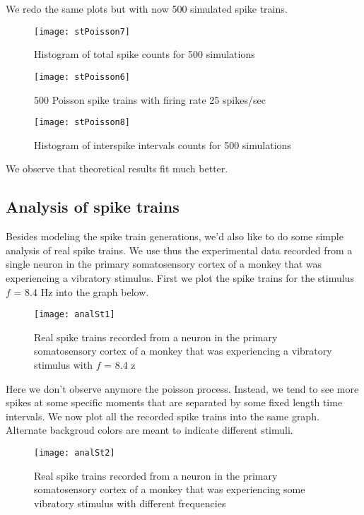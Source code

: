 \noindent
We redo the same plots but with now 500 simulated spike trains.

\vspace*{-1em}
\begin{figure}[H]
  \centering
  \texttt{[image: stPoisson7]}
  \caption{Histogram of total spike counts for 500 simulations}
\end{figure}

\begin{figure}[H]
  \centering
  \texttt{[image: stPoisson6]}
  \caption{500 Poisson spike trains with firing rate 25 spikes/sec}
\end{figure}

\vspace*{-1em}
\begin{figure}[H]
  \centering
  \texttt{[image: stPoisson8]}
  \caption{Histogram of interspike intervals counts for 500 simulations}
\end{figure}

\noindent
We observe that theoretical results fit much better.

\subsection{Analysis of spike trains}\label{subsec: anal_spikes}

Besides modeling the spike train generations, we'd also like to do some simple
analysis of real spike trains. We use thus the experimental data recorded from
a single neuron in the primary somatosensory cortex of a monkey that was
experiencing a vibratory stimulus. First we plot the spike trains for the
stimulus $f$ = 8.4 Hz into the graph below.

\begin{figure}[H]
  \centering
  \texttt{[image: analSt1]}
  \caption{Real spike trains recorded from a neuron in the primary
           somatosensory cortex of a monkey that was experiencing a vibratory 
           stimulus with $f$ = 8.4 z}
\end{figure}

Here we don't observe anymore the poisson process. Instead, we tend to see 
more spikes at some specific moments that are separated by some fixed length
time intervals. We now plot all the recorded spike trains into the same graph.
Alternate backgroud colors are meant to indicate different stimuli.

\begin{figure}[H]
  \centering
  \texttt{[image: analSt2]}
  \caption{Real spike trains recorded from a neuron in the primary
           somatosensory cortex of a monkey that was experiencing some 
           vibratory stimulus with different frequencies}
  \label{fig: real_spike_trains}
\end{figure}

